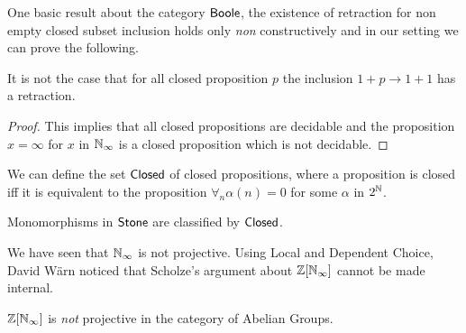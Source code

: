 One basic result about the category $\mathsf{Boole}$, the existence of retraction for non empty closed subset inclusion
holds only {\em non} constructively and in our setting we can prove the following.


\begin{proposition}
 It is not the case that for all closed proposition $p$ the inclusion $1+p\rightarrow 1+1$ has a retraction.
\end{proposition}

\begin{proof}
  This implies that all closed propositions are decidable and the proposition $x=\infty$ for $x$ in $\mathbb{N}_{\infty}$ is a
  closed proposition which is not decidable.
\end{proof}

\medskip

We can define the set $\mathsf{Closed}$ of closed propositions, where a proposition is closed iff it is equivalent to
the proposition $\forall_n \alpha(n) = 0$ for some $\alpha$ in $2^{\mathbb{N}}$.

\begin{theorem}
  Monomorphisms in $\mathsf{Stone}$ are classified by $\mathsf{Closed}$.
\end{theorem}

\medskip

We have seen that $\mathbb{N}_{\infty}$ is not projective. Using Local and Dependent Choice, David Wärn noticed that Scholze's argument
about $\mathbb{Z}[\mathbb{N}_{\infty}]$ cannot be made internal.

\begin{theorem}
   $\mathbb{Z}[\mathbb{N}_{\infty}]$ is {\em not} projective in the category of Abelian Groups.
\end{theorem}
